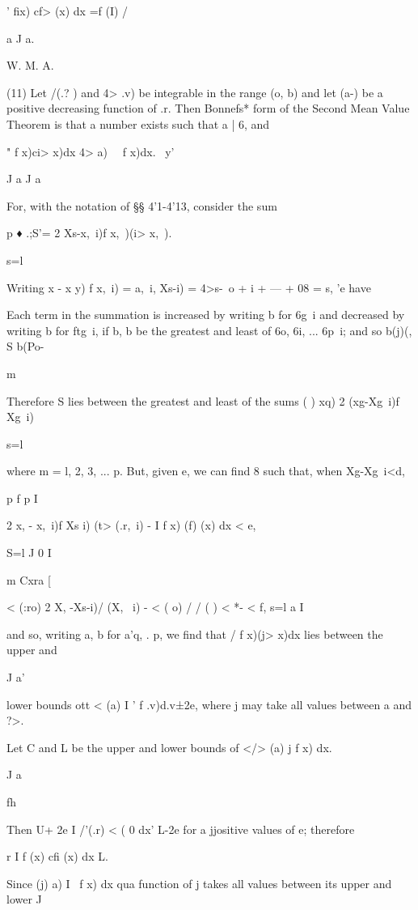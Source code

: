 ' fix) cf> (x) dx =f (I) / %

a J a.

W. M. A.

%
%

(11) Let /(.? ) and 4> .v) be integrable in the range (o, b) and let
(a-) be a positive decreasing function of .r. Then Bonnefs* form of
the Second Mean Value Theorem is that a number exists such that a | 6,
and

 " f x)ci> x)dx 4> a) \ \ f x)dx. \ y'

J a J a

For, with the notation of §§ 4'1-4'13, consider the sum

p ♦ .;S'= 2 Xs-x,\ i)f x,\ )(i> x,\ ).

s=l

Writing x - x y) f x,\ i) = a,\ i, Xs-i) = 4>s-\, o + i + --- + 08 =
s, 'e have

Each term in the summation is increased by writing b for 6g\ i and
decreased by writing b for ftg\ i, if b, b be the greatest and least
of 6o, 6i, ... 6p\ i; and so b(j)(, S b(Po-

m

Therefore S lies between the greatest and least of the sums ( ) xq) 2
(xg-Xg\ i)f Xg\ i)

s=l

where m = l, 2, 3, ... p. But, given e, we can find 8 such that, when
Xg-Xg\ i<d,

p f p I

2 x, - x,\ i)f Xs i) (t> (.r,\ i) - I f x) (f) (x) dx < e,

S=l J 0 I

m Cxra [

< (:ro) 2 X, -Xs-i)/ (X, \ i) - < ( o) / / ( ) < *- < f, s=l a I

and so, writing a, b for a'q, . p, we find that / f x)(j> x)dx lies
between the upper and

J a'

lower bounds ott < (a) I ' f .v)d.v±2e, where j may take all values
between a and ?>.

Let C and L be the upper and lower bounds of </> (a) j f x) dx.

J a

fh

Then U+ 2e I /'(.r) < ( 0 dx' L-2e for a jjositive values of e;
therefore

r I f (x) cfi (x) dx L.

Since (j) a) I \ f x) dx qua function of j takes all values between
its upper and lower J

